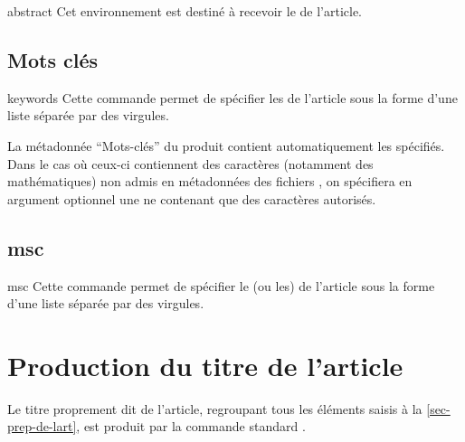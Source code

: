 \documentclass[french,nolocaltoc]{nwejmart}
\newtheorem[style=definition]{fait}
\newtheorem[title=contraventionnalisation]{ctrv}
\newtheorem[title-plural=anneaux]{anneau}
\newtheorem[title-plural=idéaux]{idéal}
\begin{document}
\begin{docEnvironment}[doc description=\mandatory,doclang/environment content=résumé]{abstract}{}
  Cet environnement est destiné à recevoir le  de l'article.
\end{docEnvironment}

\subsection{Mots clés}

\begin{docCommand}[doc description=\mandatory]{keywords}{}
  Cette commande permet de spécifier les  de l'article sous la
  forme d'une liste séparée par des virgules.

  La métadonnée \enquote{Mots-clés} du  produit contient
  automatiquement les  spécifiés.  Dans le cas où ceux-ci
  contiennent des caractères (notamment des mathématiques) non admis en
  métadonnées des fichiers  , on spécifiera en argument optionnel une
   ne contenant que des caractères autorisés.
\end{docCommand}

\begin{bodycode}[listing options={deletekeywords={[5]keywords}}]
\end{bodycode}

\subsection{\texorpdfstring{\acrfull{msc}}{MSC}}

\begin{docCommand}[doc description=\mandatory]{msc}{}
  Cette commande permet de spécifier le (ou les)  de
  l'article sous la forme d'une liste séparée par des virgules.
\end{docCommand}

\section{Production du titre de l'article}
\label{sec-creation-du-titre}

Le titre proprement dit de l'article, regroupant tous les éléments saisis à la
\vref{sec-prep-de-lart}, est produit par la commande standard
.
\end{document}
